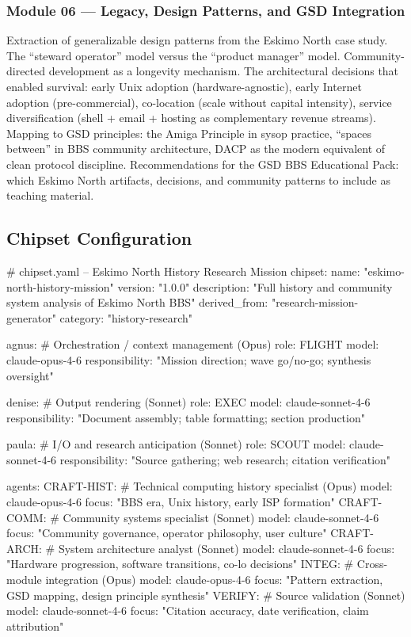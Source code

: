 \documentclass[11pt,letterpaper]{article}
\begin{document}
\subsubsection{Module 06 --- Legacy, Design Patterns, and GSD Integration}

Extraction of generalizable design patterns from the Eskimo North case study. The ``steward operator'' model versus the ``product manager'' model. Community-directed development as a longevity mechanism. The architectural decisions that enabled survival: early Unix adoption (hardware-agnostic), early Internet adoption (pre-commercial), co-location (scale without capital intensity), service diversification (shell + email + hosting as complementary revenue streams). Mapping to GSD principles: the Amiga Principle in sysop practice, ``spaces between'' in BBS community architecture, DACP as the modern equivalent of clean protocol discipline. Recommendations for the GSD BBS Educational Pack: which Eskimo North artifacts, decisions, and community patterns to include as teaching material.

\subsection{Chipset Configuration}

\begin{asciibox}
# chipset.yaml -- Eskimo North History Research Mission
chipset:
  name: "eskimo-north-history-mission"
  version: "1.0.0"
  description: "Full history and community system analysis of Eskimo North BBS"
  derived_from: "research-mission-generator"
  category: "history-research"

agnus:          # Orchestration / context management (Opus)
  role: FLIGHT
  model: claude-opus-4-6
  responsibility: "Mission direction; wave go/no-go; synthesis oversight"

denise:         # Output rendering (Sonnet)
  role: EXEC
  model: claude-sonnet-4-6
  responsibility: "Document assembly; table formatting; section production"

paula:          # I/O and research anticipation (Sonnet)
  role: SCOUT
  model: claude-sonnet-4-6
  responsibility: "Source gathering; web research; citation verification"

agents:
  CRAFT-HIST:   # Technical computing history specialist (Opus)
    model: claude-opus-4-6
    focus: "BBS era, Unix history, early ISP formation"
  CRAFT-COMM:   # Community systems specialist (Sonnet)
    model: claude-sonnet-4-6
    focus: "Community governance, operator philosophy, user culture"
  CRAFT-ARCH:   # System architecture analyst (Sonnet)
    model: claude-sonnet-4-6
    focus: "Hardware progression, software transitions, co-lo decisions"
  INTEG:        # Cross-module integration (Opus)
    model: claude-opus-4-6
    focus: "Pattern extraction, GSD mapping, design principle synthesis"
  VERIFY:       # Source validation (Sonnet)
    model: claude-sonnet-4-6
    focus: "Citation accuracy, date verification, claim attribution"
\end{asciibox}
\end{document}

